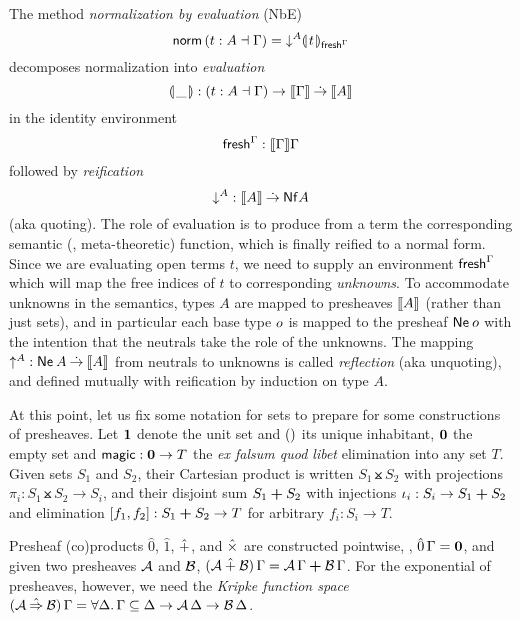 \documentclass[sigconf,screen,fleqn]{acmart} %
\begin{document}
%
The method
\emph{normalization by evaluation} (NbE)
\[
  \mathsf{norm}\, (t : A \dashv \Gamma)
  = \mathord{\downarrow_{}^{A}} \llparenthesis\kern0.3ext\kern0.3ex\rrparenthesis_{\mathsf{fresh}^{\Gamma}}
\]
decomposes normalization into
\emph{evaluation}
\[%
\denty\_ : (t : A \from \Gamma) \to \den \Gamma \todot
  \den A
\]%
in the identity environment
\[%
\idenv\Gamma : \den \Gamma \Gamma
\]%
followed by
\emph{reification}
\[%
\down A : \den A \todot \tNf A
\]%
(aka quoting).
The role of evaluation is to produce from a term the corresponding
semantic (\ie, meta-theoretic) function, which is finally reified to a normal form.
Since we are evaluating open terms $t$, we need to supply an environment
$\mathsf{fresh}^{\Gamma}$ which will map the free indices of $t$ to corresponding
\emph{unknowns}.  To accommodate unknowns in the semantics, types $A$
are mapped to presheaves $\mathopen{{[\kern-0.14em[}} A \mathclose{{]\kern-0.14em]}}$ (rather than just sets), and in
particular each base type $o$ is mapped to the presheaf
$\mathsf{Ne}^{}\,o$ with the intention that the neutrals take the role of
the unknowns.  The mapping $\mathord{\uparrow_{}^{A}} : \mathsf{Ne}^{}\,A \mathbin{\dot{\to}} \mathopen{{[\kern-0.14em[}} A \mathclose{{]\kern-0.14em]}}$ from
neutrals to unknowns is called \emph{reflection} (aka unquoting), and defined mutually
with reification by induction on type $A$.

At this point, let us fix some notation for sets to prepare for some
constructions of presheaves.  Let $\mbox{\textbf{1}}$ denote the unit set and
$()$ its unique inhabitant, $\mbox{\textbf{0}}$ the empty set and
$\mathsf{magic} : \mbox{\textbf{0}} \to T$ the \emph{ex falsum quod libet} elimination
into any set $T$.  Given sets $S_1$ and $S_2$, their Cartesian product
is written $S_1 \btimes S_2$ with projections $\pi_i : S_1 \btimes S_2
\to S_i$, and their disjoint sum $S_1 \boldsymbol{+} S_2$ with injections
$\iota_i : S_i \to S_1 \boldsymbol{+} S_2$ and elimination $[f_1,f_2] : S_1 \boldsymbol{+}
S_2 \to T$ for arbitrary $f_i : S_i \to T$.

Presheaf (co)products $\hat0$, $\hat1$, $\mathbin{\hat+}$, and $\mathbin{\hat\times}$ are
constructed pointwise, \eg, $\hat0\,\Gamma = \mbox{\textbf{0}}$, and given two
presheaves $\mathcal{A}$ and $\mathcal{B}$,
$(\mathcal{A} \mathbin{\hat+} \mathcal{B})\,\Gamma = \mathcal{A}\,\Gamma \boldsymbol{+} \mathcal{B}\,\Gamma$.  For the
exponential of presheaves, however, we need the \emph{Kripke function
  space}
$(\A \hatto \B)\,\Gamma = \forall \Delta.\, \Gamma \sublist \Delta
\to \A\,\Delta \to \B\,\Delta$.
\end{document}
